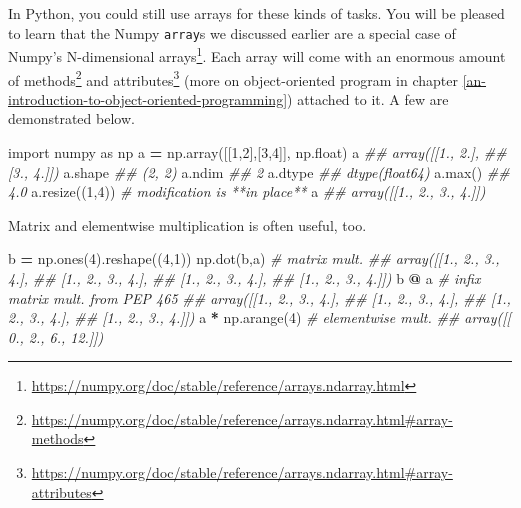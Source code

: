 \documentclass[
  12pt,
  krantz2]{krantz}
\makeatletter
\newenvironment{Shaded}{\begin{snugshade}}{\end{snugshade}}
\newcommand{\BuiltInTok}[1]{#1}
\newcommand{\CommentTok}[1]{\textcolor[rgb]{0.37,0.37,0.37}{\textit{#1}}}
\newcommand{\DecValTok}[1]{\textcolor[rgb]{0.06,0.06,0.06}{#1}}
\newcommand{\ImportTok}[1]{#1}
\newcommand{\NormalTok}[1]{#1}
\newcommand{\OperatorTok}[1]{\textcolor[rgb]{0.43,0.43,0.43}{\textbf{#1}}}
\renewcommand{\href}[2]{#2\footnote{\url{#1}}}
\newenvironment{kframe}{%
\medskip{}
\setlength{\fboxsep}{.8em}
 \def\at@end@of@kframe{}%
 \ifinner\ifhmode%
  \def\at@end@of@kframe{\end{minipage}}%
  \begin{minipage}{\columnwidth}%
 \fi\fi%
 \def\FrameCommand##1{\hskip\@totalleftmargin \hskip-\fboxsep
 \colorbox{shadecolor}{##1}\hskip-\fboxsep
     \hskip-\linewidth \hskip-\@totalleftmargin \hskip\columnwidth}%
 \MakeFramed {\advance\hsize-\width
   \@totalleftmargin\z@ \linewidth\hsize
   \@setminipage}}%
 {\par\unskip\endMakeFramed%
 \at@end@of@kframe}
\renewenvironment{Shaded}{\begin{kframe}}{\end{kframe}}
\makeatother
\begin{document}
In Python, you could still use arrays for these kinds of tasks. You will be pleased to learn that the Numpy \texttt{array}s we discussed earlier are a special case of \href{https://numpy.org/doc/stable/reference/arrays.ndarray.html}{Numpy's N-dimensional arrays}. Each array will come with an enormous amount of \href{https://numpy.org/doc/stable/reference/arrays.ndarray.html\#array-methods}{methods} and \href{https://numpy.org/doc/stable/reference/arrays.ndarray.html\#array-attributes}{attributes} (more on object-oriented program in chapter \ref{an-introduction-to-object-oriented-programming}) attached to it. A few are demonstrated below.

\begin{Shaded}
\begin{Highlighting}[]
\ImportTok{import}\NormalTok{ numpy }\ImportTok{as}\NormalTok{ np}
\NormalTok{a }\OperatorTok{=}\NormalTok{ np.array([[}\DecValTok{1}\NormalTok{,}\DecValTok{2}\NormalTok{],[}\DecValTok{3}\NormalTok{,}\DecValTok{4}\NormalTok{]], np.}\BuiltInTok{float}\NormalTok{)}
\NormalTok{a}
\CommentTok{\#\# array([[1., 2.],}
\CommentTok{\#\#        [3., 4.]])}
\NormalTok{a.shape}
\CommentTok{\#\# (2, 2)}
\NormalTok{a.ndim}
\CommentTok{\#\# 2}
\NormalTok{a.dtype}
\CommentTok{\#\# dtype(\textquotesingle{}float64\textquotesingle{})}
\NormalTok{a.}\BuiltInTok{max}\NormalTok{()}
\CommentTok{\#\# 4.0}
\NormalTok{a.resize((}\DecValTok{1}\NormalTok{,}\DecValTok{4}\NormalTok{)) }\CommentTok{\# modification is **in place**}
\NormalTok{a}
\CommentTok{\#\# array([[1., 2., 3., 4.]])}
\end{Highlighting}
\end{Shaded}

Matrix and elementwise multiplication is often useful, too.

\begin{Shaded}
\begin{Highlighting}[]
\NormalTok{b }\OperatorTok{=}\NormalTok{ np.ones(}\DecValTok{4}\NormalTok{).reshape((}\DecValTok{4}\NormalTok{,}\DecValTok{1}\NormalTok{)) }
\NormalTok{np.dot(b,a) }\CommentTok{\# matrix mult.}
\CommentTok{\#\# array([[1., 2., 3., 4.],}
\CommentTok{\#\#        [1., 2., 3., 4.],}
\CommentTok{\#\#        [1., 2., 3., 4.],}
\CommentTok{\#\#        [1., 2., 3., 4.]])}
\NormalTok{b }\OperatorTok{@}\NormalTok{ a }\CommentTok{\# infix matrix mult. from PEP 465}
\CommentTok{\#\# array([[1., 2., 3., 4.],}
\CommentTok{\#\#        [1., 2., 3., 4.],}
\CommentTok{\#\#        [1., 2., 3., 4.],}
\CommentTok{\#\#        [1., 2., 3., 4.]])}
\NormalTok{a }\OperatorTok{*}\NormalTok{ np.arange(}\DecValTok{4}\NormalTok{) }\CommentTok{\# elementwise mult.}
\CommentTok{\#\# array([[ 0.,  2.,  6., 12.]])}
\end{Highlighting}
\end{Shaded}
\end{document}
